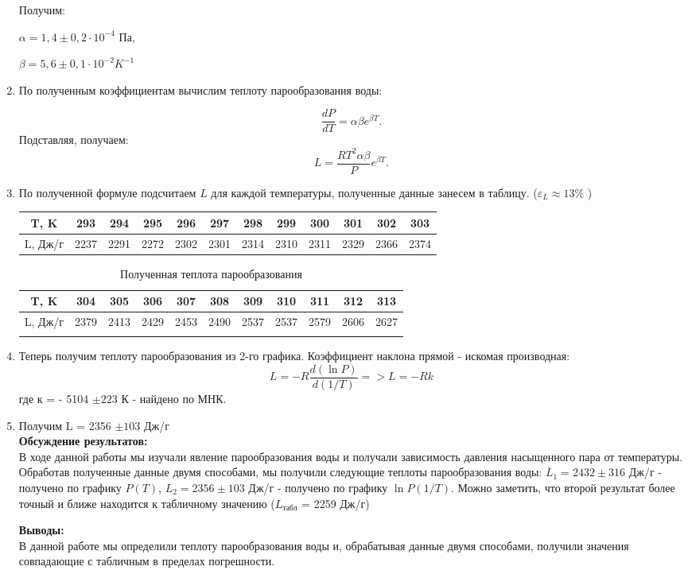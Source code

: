 \documentclass[a4paper, 12pt]{article}%
\begin{document}
\begin{enumerate}
	
	Получим: 
	
	$\alpha = 1,4 \pm 0,2 \cdot 10^{-4} $ Па, 
	
	$\beta = 5,6 \pm 0,1 \cdot 10^{-2} K^{-1}$ 
	
	
	\item По полученным коэффициентам вычислим теплоту парообразования воды:
	
	$$
	\frac{dP}{dT} = \alpha \beta e^{\beta T}.
    $$
    Подставляя, получаем:
    $$
    L=\frac{RT^2\alpha \beta }{P}e^{\beta T}.
    $$
	
	
	\item По полученной формуле подсчитаем $L$ для каждой температуры, полученные данные занесем в таблицу. ($\varepsilon_L \approx 13 \% $ )
	
	\begin{longtable}{|c|c|c|c|c|c|c|c|c|c|c|c|}
		\hline
	T, K& 293& 294& 295&296& 297& 298& 299& 300& 301& 302&303  \\ \hline
	L, Дж/г & 2237& 2291& 2272&2302 & 2301& 2314& 2310& 2311& 2329& 2366& 2374 \\ \hline
	\end{longtable}
	
		\begin{longtable}{|c|c|c|c|c|c|c|c|c|c|c|}\hline
		T, K& 304& 305& 306& 307& 308& 309& 310& 311& 312& 313   \\ \hline
		L, Дж/г & 2379& 2413& 2429& 2453& 2490& 2537& 2537& 2579& 2606& 2627  \\ \hline
		\caption{Полученная теплота парообразования}
	\end{longtable}
	
	
	\item Теперь получим теплоту парообразования из 2-го графика. Коэффициент наклона прямой - искомая производная:
	$$ L =-R\frac{d(\ln P)}{d(1/T)}  => L = -R k$$
	 где к = - 5104 $\pm 223$ К - найдено по МНК.
	\item Получим L = 2356 $\pm 103 $ Дж/г\\
	
	
	
	\textbf{Обсуждение результатов: }\\
	
	В ходе данной работы мы изучали явление парообразования воды и получали зависимость давления насыщенного пара от температуры. Обработав полученные данные двумя способами, мы получили следующие теплоты парообразования воды:
	$\overline L_1 = 2432 \pm 316$ Дж/г - получено по графику $P(T)$,
	$L_2 = 2356 \pm 103$ Дж/г - получено по графику  $\ln P(1/T)$.
	 Можно заметить, что второй результат более точный и ближе находится к табличному значению ($L_{\text{табл}}$ = 2259 Дж/г)
	
	
	\textbf{Выводы: }\\
	В данной работе мы определили теплоту парообразования воды и, обрабатывая данные двумя способами, получили значения совпадающие с табличным в пределах погрешности.
	
	
	\end{enumerate}
	
\end{document}
